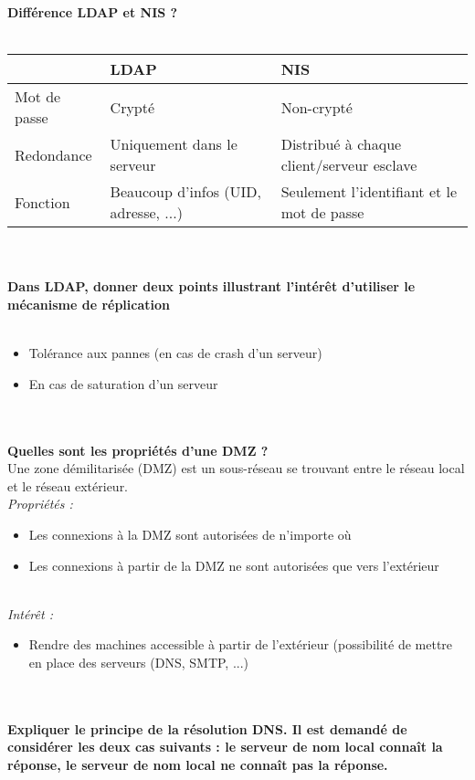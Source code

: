 \documentclass[journal, a4paper]{IEEEtran}
\begin{document}
\newpage
\textbf{Différence LDAP et NIS ?}\\
~\\
\begin{tabular}{|p{2cm}|p{2cm}|p{2cm}|}
\hline
~ 				& \textbf{LDAP} 				& \textbf{NIS}\\
\hline
\hline
Mot de passe	& Crypté 						& Non-crypté\\
\hline
Redondance		& Uniquement dans le serveur	& Distribué à chaque client/serveur esclave\\
\hline
Fonction		& Beaucoup d'infos (UID, adresse, ...) & Seulement l'identifiant et le mot de passe\\
\hline
\end{tabular}
~\\
~\\
\textbf{Dans LDAP, donner deux points illustrant l'intérêt d'utiliser le mécanisme de réplication}\\
~\\
\begin{itemize}
	\item Tolérance aux pannes (en cas de crash d'un serveur)
	\item En cas de saturation d'un serveur
\end{itemize}
~\\
~\\
\textbf{Quelles sont les propriétés d'une DMZ ?}\\
Une zone démilitarisée (DMZ) est un sous-réseau se trouvant entre le réseau local et le réseau extérieur.
~\\
\textit{Propriétés :}
\begin{itemize}
	\item Les connexions à la DMZ sont autorisées de n’importe où
	\item Les connexions à partir de la DMZ ne sont autorisées que vers l’extérieur
\end{itemize}
~\\
\textit{Intérêt :}
\begin{itemize}
	\item Rendre des machines accessible à partir de l’extérieur (possibilité de mettre en place des serveurs (DNS, SMTP, ...)
\end{itemize}
~\\
~\\
\textbf{Expliquer le principe de la résolution DNS. Il est demandé de considérer les deux cas suivants : le serveur de nom local connaît la réponse, le serveur de nom local ne connaît pas la réponse.}\\
\end{document}

